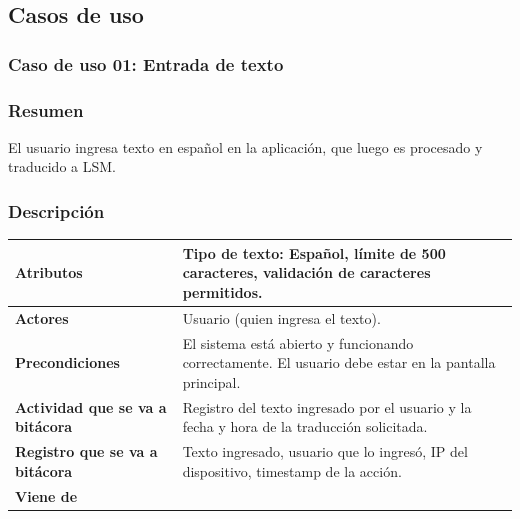 \subsection{Casos de uso}
\subsubsection{Caso de uso 01: Entrada de texto}
\subsubsection{Resumen}
El usuario ingresa texto en español en la aplicación, que luego es procesado y traducido a LSM.
\subsubsection{Descripción}

\noindent
\begin{tabularx}{\textwidth}{|l|X|}
\hline
\textbf{Atributos} & Tipo de texto: Español, límite de 500 caracteres, validación de caracteres permitidos. \\ \hline
\textbf{Actores} & Usuario (quien ingresa el texto). \\ \hline
\textbf{Precondiciones} & El sistema está abierto y funcionando correctamente. El usuario debe estar en la pantalla principal. \\ \hline
\textbf{Actividad que se va a bitácora} & Registro del texto ingresado por el usuario y la fecha y hora de la traducción solicitada. \\ \hline
\textbf{Registro que se va a bitácora} & Texto ingresado, usuario que lo ingresó, IP del dispositivo, timestamp de la acción. \\ \hline
\textbf{Viene de} &  \\ \hline
\end{tabularx}

    

